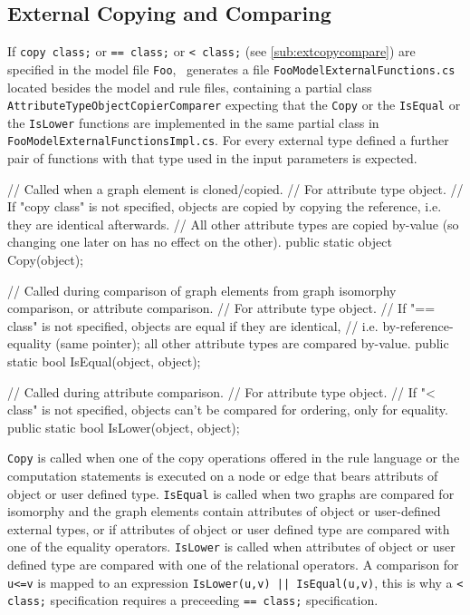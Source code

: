 \subsection*{External Copying and Comparing}\label{sub:apiextcopycompare}
If \texttt{copy class;} or \texttt{== class;} or \texttt{< class;} (see \ref{sub:extcopycompare}) are specified in the model file \texttt{Foo},
\GrG~generates a file \texttt{FooModelExternalFunctions.cs} located besides the model and rule files,
containing a partial class \texttt{AttributeTypeObjectCopierComparer} expecting that the \texttt{Copy} or the \texttt{IsEqual} or the \texttt{IsLower} functions are implemented in the same partial class in \texttt{FooModelExternalFunctionsImpl.cs}.
For every external type defined a further pair of functions with that type used in the input parameters is expected.

\begin{csharplet}
// Called when a graph element is cloned/copied.
// For attribute type object.
// If "copy class" is not specified, objects are copied by copying the reference, i.e. they are identical afterwards.
// All other attribute types are copied by-value (so changing one later on has no effect on the other).
public static object Copy(object);

// Called during comparison of graph elements from graph isomorphy comparison, or attribute comparison.
// For attribute type object.
// If "== class" is not specified, objects are equal if they are identical,
// i.e. by-reference-equality (same pointer); all other attribute types are compared by-value.
public static bool IsEqual(object, object);

// Called during attribute comparison.
// For attribute type object.
// If "< class" is not specified, objects can't be compared for ordering, only for equality.
public static bool IsLower(object, object);
\end{csharplet}

\texttt{Copy} is called when one of the copy operations offered in the rule language or the computation statements is executed on a node or edge that bears attributs of object or user defined type.
\texttt{IsEqual} is called when two graphs are compared for isomorphy and the graph elements contain attributes of object or user-defined external types, or if attributes of object or user defined type are compared with one of the equality operators.
\texttt{IsLower} is called when attributes of object or user defined type are compared with one of the relational operators.
A comparison for \texttt{u<=v} is mapped to an expression \verb#IsLower(u,v) || IsEqual(u,v)#, this is why a \verb#< class;# specification requires a preceeding \verb#== class;# specification.

